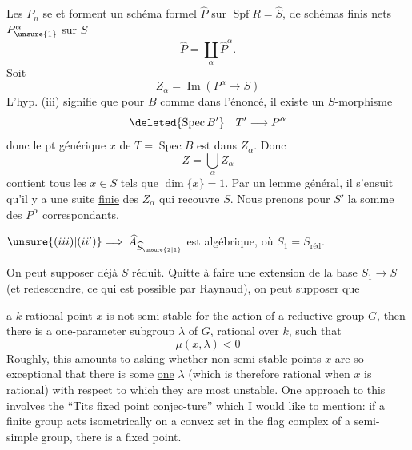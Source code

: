 Les $P_n$ se  et forment un schéma formel $\widehat P$ sur $\operatorname{Spf}R=\widehat S$,   de schémas finis nets $P^\alpha_{\unsure{1}}$ sur $S$
\[
\widehat P=\coprod_\alpha\widehat P^\alpha.
\]
Soit
\[
Z_\alpha=\operatorname{Im}(P^\alpha\longrightarrow S)
\]
L'hyp. (iii) signifie que pour $B$ comme dans l'énoncé, il existe un  $S$-morphisme
\[
\deleted{\operatorname{Spec}B'}\quad T'\longrightarrow P^\alpha
\]
donc le pt générique $x$ de $T=\operatorname{Spec}B$ est dans $Z_\alpha$.
Donc
\[
Z=\bigcup_\alpha Z_\alpha
\]
contient tous les $x\in S$ tels que $\dim\overline{\{x\}}=1$.
Par un lemme général, il s'ensuit qu'il y a une suite \uline{finie} des $Z_\alpha$ qui recouvre $S$. Nous prenons pour $S'$ la somme des $P^\alpha$ correspondants.

$\unsure{(iii)|(ii')}\Longrightarrow$   $\widehat A_{\widehat S_{\unsure{2|1}}}$ est algébrique, où $S_1=S_{\text{réd}}$.

On peut supposer déjà $S$ réduit. Quitte à faire une extension de la base $S_1\longrightarrow S$ (et redescendre,  ce qui est possible par Raynaud), on peut supposer que



a $k$-rational point $x$ is not semi-stable for the action of a reductive group $G$, then there is a one-parameter subgroup $\lambda$ of $G$, rational over $k$, such that
\[
\mu(x,\lambda)<0
\]
Roughly, this amounts to asking whether non-semi-stable points $x$ are \uline{so} exceptional that there is some \uline{one} $\lambda$ (which is therefore rational when $x$ is rational) with respect to which they are most unstable. One approach to this involves the ``Tits fixed point conjec-ture'' which I would like to mention: if a finite group acts isometrically on a convex set in the flag complex of a semi-simple group, there is a fixed point.


